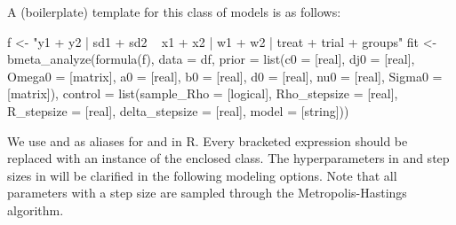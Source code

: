 A (boilerplate) template for this class of models is as follows:
\begin{example}
  f <- "y1 + y2 | sd1 + sd2 ~ x1 + x2 | w1 + w2 | treat + trial + groups"
  fit <- bmeta_analyze(formula(f), data = df,
          prior = list(c0 = [real], dj0 = [real], Omega0 = [matrix],
                       a0 = [real], b0 = [real],
                       d0 = [real], nu0 = [real], Sigma0 = [matrix]),
          control = list(sample_Rho = [logical], Rho_stepsize = [real],
                      R_stepsize = [real], delta_stepsize = [real], model = [string]))
\end{example}
We use  and  as aliases for  and  in R. Every bracketed expression should be replaced with an instance of the enclosed class. The hyperparameters in  and step sizes in  will be clarified in the following modeling options. Note that all parameters with a step size are sampled through the Metropolis-Hastings algorithm.


